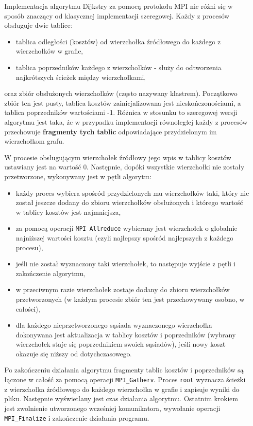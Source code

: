 \documentclass[12pt]{article}
\begin{document}
\vspace{5mm}
Implementacja algorytmu Dijkstry za pomocą protokołu MPI nie różni się w sposób znaczący od klasycznej implementacji szeregowej. Każdy z procesów obsługuje dwie tablice: 
\begin{itemize}
\item tablica odległości (kosztów) od wierzchołka źródłowego do każdego z wierzchołków w grafie,
\item tablica poprzedników każdego z wierzchołków - służy do odtworzenia najkrótszych ścieżek między wierzchołkami,
\end{itemize}
oraz zbiór obsłużonych wierzchołków (często nazywany klastrem). Początkowo zbiór ten jest pusty, tablica kosztów zainicjalizowana jest nieskończonościami, a tablica poprzedników wartościami -1. Różnica w stosunku to szeregowej wersji algorytmu jest taka, że w przypadku implementacji równoległej każdy z procesów przechowuje \textbf{fragmenty tych tablic} odpowiadające przydzielonym im wierzchołkom grafu.

\vspace{5mm}
W procesie obsługującym wierzchołek źródłowy jego wpis w tablicy kosztów ustawiany jest na wartość 0. Następnie, dopóki wszystkie wierzchołki nie zostały przetworzone, wykonywany jest w pętli algorytm:
\begin{itemize}
\item każdy proces wybiera spośród przydzielonych mu wierzchołków taki, który nie został jeszcze dodany do zbioru wierzchołków obsłużonych i którego wartość w tablicy kosztów jest najmniejsza,
\item za pomocą operacji \lstinline{MPI_Allreduce} wybierany jest wierzchołek o globalnie najniższej wartości kosztu (czyli najlepszy spośród najlepszych z każdego procesu),
\item jeśli nie został wyznaczony taki wierzchołek, to następuje wyjście z pętli i zakończenie algorytmu,
\item w przeciwnym razie wierzchołek zostaje dodany do zbioru wierzchołków przetworzonych (w każdym procesie zbiór ten jest przechowywany osobno, w całości),
\item dla każdego nieprzetworzonego sąsiada wyznaczonego wierzchołka dokonywana jest aktualizacja w tablicy kosztów i poprzedników (wybrany wierzchołek staje się poprzednikiem swoich sąsiadów), jeśli nowy koszt okazuje się niższy od dotychczasowego.
\end{itemize}
Po zakończeniu działania algorytmu fragmenty tablic kosztów i poprzedników są łączone w całość za pomocą operacji \lstinline{MPI_Gatherv}. Proces \lstinline{root} wyznacza ścieżki z wierzchołka źródłowego do każdego wierzchołka w grafie i zapisuje wyniki do pliku. Następnie wyświetlany jest czas działania algorytmu. Ostatnim krokiem jest zwolnienie utworzonego wcześniej komunikatora, wywołanie operacji \lstinline{MPI_Finalize} i zakończenie działania programu.
\end{document}
